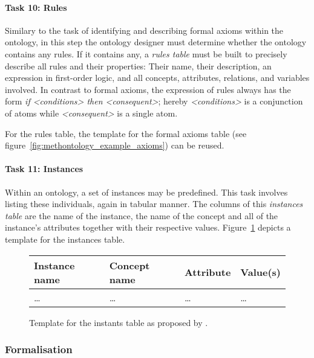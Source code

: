 \paragraph{Task 10: Rules}

Similary to the task of identifying and describing formal axioms within the ontology, in this step the ontology designer must determine whether the ontology contains any rules. If it contains any, a \emph{rules table} must be built to precisely describe all rules and their properties: Their name, their description, an expression in first-order logic, and all concepts, attributes, relations, and variables involved. In contrast to formal axioms, the expression of rules always has the form \emph{if <conditions> then <consequent>}; hereby \emph{<conditions>} is a conjunction of atoms while \emph{<consequent>} is a single atom.

For the rules table, the template for the formal axioms table (see figure~\ref{fig:methontology_example_axioms}) can be reused.

\paragraph{Task 11: Instances}

Within an ontology, a set of instances may be predefined. This task involves listing these individuals, again in tabular manner. The columns of this \emph{instances table} are the name of the instance, the name of the concept and all of the instance's attributes together with their respective values. Figure~\ref{fig:methontology_example_instances} depicts a template for the instances table.

\begin{figure}
\centering
\begin{tabular}{|p{}|p{}|p{}|p{}|}
  \hline
  \textbf{Instance name} & \textbf{Concept name} & \textbf{Attribute} & \textbf{Value(s)} \\
  \hline\hline
  … & … & … & … \\
  \hline
\end{tabular}
\caption{Template for the instants table as proposed by \methontology.}
\label{fig:methontology_example_instances}
\end{figure}

\subsubsection{Formalisation}

